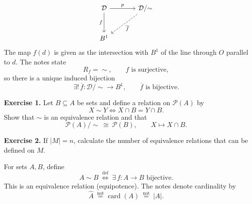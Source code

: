 \[
\begin{tikzcd}[column sep=large,row sep=large]
 \mathcal D\arrow[r,"p"]\arrow[d,"f"']
   & \mathcal D/{\sim}\arrow[dl,dashed,"\overline f"]\\
 B^1 &
\end{tikzcd}
\]
The map $f(d)$ is given as the intersection with $B^1$ of the line
through $O$ parallel to $d$.
The notes state
\[
 R_f=\sim,\qquad f\text{ is surjective},
\]
so there is a unique induced bijection
\[
 \exists!\,\overline f:\mathcal D/{\sim}\longrightarrow B^1,
 \qquad \overline f\text{ is bijective}.
\]

\medskip
\noindent\textbf{Exercise 1.}
Let $B\subseteq A$ be sets and define a relation on $\mathcal P(A)$ by
\[
 X\sim Y\iff X\cap B=Y\cap B.
\]
Show that $\sim$ is an equivalence relation and that
\[
 \mathcal P(A)/{\sim}\ \cong\ \mathcal P(B),
 \qquad X\longmapsto X\cap B.
\]

\noindent\textbf{Exercise 2.}
If $|M|=n$, calculate the number of equivalence relations
that can be defined on $M$.

\medskip
\noindent For sets $A,B$, define
\[
 A\sim B\ \overset{\mathrm{def}}{\iff}\
 \exists\,f:A\longrightarrow B\text{ bijective}.
\]
This is an equivalence relation (equipotence). The notes denote
cardinality by
\[
 \boxed{\widehat A\ \overset{\mathrm{not}}{=}
 \operatorname{card}(A)\ \overset{\mathrm{not}}{=}\ |A|}.
\]

\endgroup
